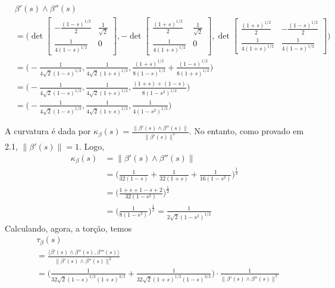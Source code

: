\documentclass[../main.tex]{subfiles}
\begin{document}
\begin{solucao}
\begin{enumerate}
\begin{itemize}
					\begin{align*}
						&\beta'(s)\wedge\beta''(s)\\
						&=\bigg(\det\begin{bmatrix} -\frac{(1-s)^{1/2}}{2} & \frac{1}{\sqrt{2}} \\ \frac{1}{4(1-s)^{1/2}} & 0 \end{bmatrix}, -\det\begin{bmatrix} \frac{(1+s)^{1/2}}{2} & \frac{1}{\sqrt{2}} \\ \frac{1}{4(1+s)^{1/2}} & 0 \end{bmatrix}, \det\begin{bmatrix} \frac{(1+s)^{1/2}}{2} & -\frac{(1-s)^{1/2}}{2} \\ \frac{1}{4(1+s)^{1/2}} & \frac{1}{4(1-s)^{1/2}} \end{bmatrix}\bigg)\\
						&=\bigg(-\frac{1}{4\sqrt{2}(1-s)^{1/2}}, \frac{1}{4\sqrt{2}(1+s)^{1/2}}, \frac{(1+s)^{1/2}}{8(1-s)^{1/2}}+\frac{(1-s)^{1/2}}{8(1+s)^{1/2}}\bigg)\\
						&=\bigg(-\frac{1}{4\sqrt{2}(1-s)^{1/2}}, \frac{1}{4\sqrt{2}(1+s)^{1/2}}, \frac{(1+s)+(1-s)}{8(1-s^2)^{1/2}}\bigg)\\
						&=\bigg(-\frac{1}{4\sqrt{2}(1-s)^{1/2}}, \frac{1}{4\sqrt{2}(1+s)^{1/2}}, \frac{1}{4(1-s^2)^{1/2}}\bigg)
					\end{align*}
				\end{itemize}
				A curvatura é dada por $\kappa_{\beta}(s)=\frac{\|\beta'(s)\wedge\beta''(s)\|}{\|\beta'(s)\|^3}$. No entanto, como provado em 2.1, $\|\beta'(s)\|=1$. Logo,
				\begin{align*}
					\kappa_{\beta}(s)
					&=\|\beta'(s)\wedge\beta''(s)\|\\
					&=\bigg(\frac{1}{32(1-s)}+\frac{1}{32(1+s)}+\frac{1}{16(1-s^2)}\bigg)^{\tfrac{1}{2}}\\
					&=\bigg(\frac{1+s+1-s+2}{32(1-s^2)}\bigg)^{\tfrac{1}{2}}\\
					&=\bigg(\frac{1}{8(1-s^2)}\bigg)^{\tfrac{1}{2}}=\frac{1}{2\sqrt{2}(1-s^2)^{1/2}}
				\end{align*}
				Calculando, agora, a torção, temos
				\begin{align*}
					&\tau_{\beta}(s)\\
					&=\frac{\langle\beta'(s)\wedge \beta''(s), \beta'''(s)\rangle}{\|\beta'(s)\wedge\beta''(s)\|^2}\\
					&=\bigg(\frac{1}{32\sqrt{2}(1-s)^{1/2}(1+s)^{3/2}}+\frac{1}{32\sqrt{2}(1+s)^{1/2}(1-s)^{3/2}}\bigg)\cdot \frac{1}{\|\beta'(s)\wedge\beta''(s)\|^2}\\

\end{align*}
\end{enumerate}
\end{solucao}
\end{document}
